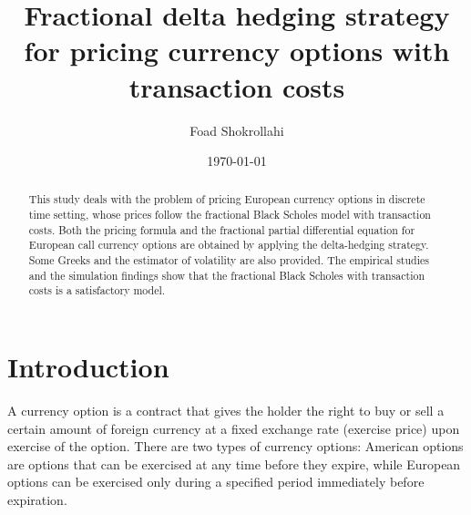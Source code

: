 \documentclass[a4paper,11pt]{amsart}
\numberwithin{equation}{section}
\theoremstyle{definition}
\theoremstyle{plain}
\theoremstyle{definition}
\newcommand{\1}{\mathbf{1}}
\begin{document}
\title[Fractional delta hedging strategy]
{Fractional delta hedging strategy for pricing currency options with transaction costs}

\date{\today}

\author[Shokrollahi]{Foad Shokrollahi}
\address{Department of Mathematics and Statistics, University of Vaasa, P.O. Box 700, FIN-65101 Vaasa, FINLAND}






\begin{abstract}
This study deals with the problem of pricing European currency options in discrete time setting, whose prices follow the fractional Black Scholes model with transaction costs. Both the pricing formula and the fractional partial
differential equation for European call currency options are obtained by applying the delta-hedging strategy. Some Greeks and the
estimator of volatility are also provided. The empirical studies and the simulation findings show that the fractional Black Scholes with transaction costs is a satisfactory model.
\end{abstract}


\maketitle
\section{Introduction}\label{sec:1}

A currency option is a contract that gives the holder the right to buy or sell a
certain amount of foreign currency at a fixed exchange rate (exercise price) upon
exercise of the option. There are two types of currency options: American options are options that can be exercised at any
time before they expire, while European options can be exercised only during a specified
period immediately before expiration.
\end{document}
